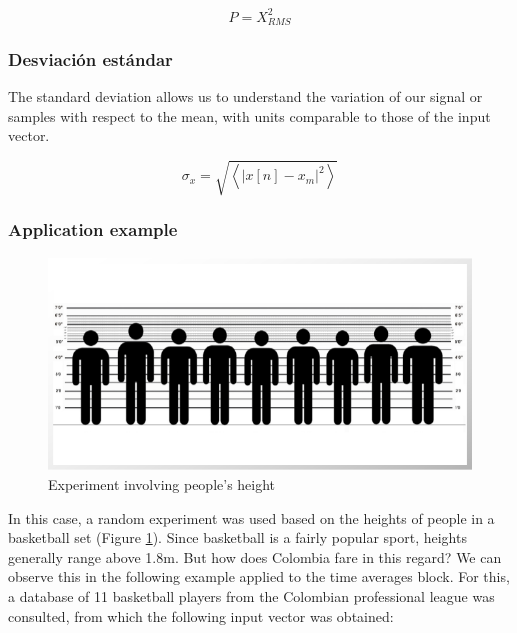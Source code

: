 \documentclass{journal}[IEEEtran, twocolumn]             %
\begin{document}
\begin{multicols}{2}
\begin{equation*}
    P = X_{RMS}^{2}
\end{equation*}

\subsubsection{Desviación estándar}

The standard deviation allows us to understand the variation of our signal or samples with respect to the mean, with units comparable to those of the input vector.

\begin{equation*}
    \sigma_{x} = \sqrt{\left \langle |x[n]-x_{m}|^{2} \right \rangle}
\end{equation*}

\subsubsection{Application example}

\begin{figure}[H]
        \centering
        \begin{adjustbox}{frame=1pt 1pt,center=1pt}
            \includegraphics[width=0.8\columnwidth]{figs/height.png}
        \end{adjustbox}
        \caption{\centering Experiment involving people's height}
        \label{fig:fig_5}
\end{figure}

In this case, a random experiment was used based on the heights of people in a basketball set (Figure \ref{fig:fig_5}). Since basketball is a fairly popular sport, heights generally range above 1.8m. But how does Colombia fare in this regard? We can observe this in the following example applied to the time averages block. For this, a database of 11 basketball players from the Colombian professional league was consulted, from which the following input vector was obtained:


\end{multicols}
\end{document}

